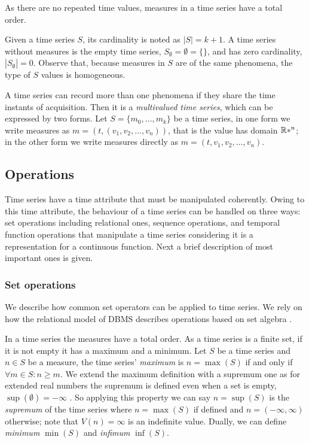 As there are no repeated time values, measures in a time series have a
total order.

Given a time series $S$, its cardinality is noted as $|S|=k+1$.  A
time series without measures is the empty time series,
$S_\emptyset=\emptyset=\{\}$, and has zero cardinality,
$|S_\emptyset|=0$.  Observe that, because measures in $S$ are of the
same phenomena, the type of $S$ values is homogeneous.



A time series can record more than one phenomena if they share the
time instants of acquisition. Then it is a \emph{multivalued time
series}, which can be expressed by two forms. Let $S = \{m_0, \ldots,
m_k\}$ be a time series, in one form we write measures as
$m=(t,(v_1,v_2,\ldots,v_n))$, that is the value has domain $\mathbb{R}*^n$; in
the other form we write measures directly as
$m=(t,v_1,v_2,\ldots,v_n)$.




\subsection{Operations}

Time series have a time attribute that must be manipulated
coherently. Owing to this time attribute, the behaviour of a time
series can be handled on three ways:  set operations including
relational ones,  sequence operations, and  temporal function
operations that manipulate a time series considering it is a
representation for a continuous function. Next a brief description of
most important ones is given.



\subsubsection{Set operations}

We describe how common set operators can be applied to time series. We
rely on how the relational model of DBMS describes operations based on
set algebra \cite{date:introduction}.


In a time series the measures have a total order.  As a time series is
a finite set, if it is not empty it has a maximum and a minimum.  Let
$S$ be a time series and $n\in S$ be a measure, the time series'
\emph{maximum} is $n=\max(S)$ if and only if $\forall m \in S: n \geq
m $.  We extend the maximum definition with a supremum one as for
extended real numbers the supremum is defined even when a set is
empty, $\sup(\emptyset)=-\infty$ \cite{cantrell:extendedreal}. So
applying this property we can say $n=\sup(S)$ is the \emph{supremum}
of the time series where $n=\max(S)$ if defined and
$n=(-\infty,\infty)$ otherwise; note that $V(n)=\infty$ is an
indefinite value.  Dually, we can define \emph{minimum} $\min(S)$ and
\emph{infimum} $\inf(S)$.


